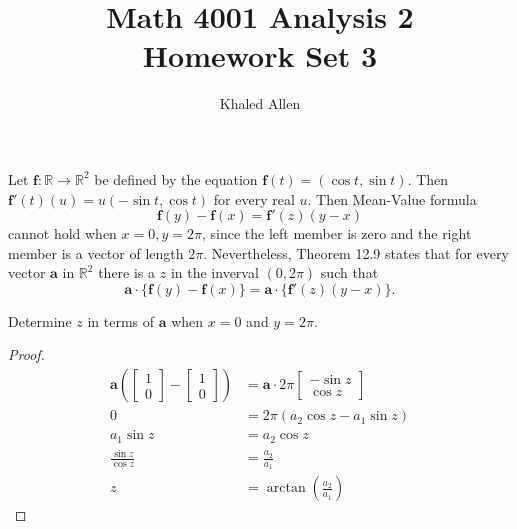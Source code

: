 \documentclass[12pt]{article}
\newcommand{\R}{\mathbb{R}}
\newcommand{\bvec}[1]{\textbf{#1}}
\newenvironment{problem}[2][Problem]{\begin{trivlist}
\item[\hskip \labelsep {\bfseries #1}\hskip \labelsep {\bfseries #2.}]}{\end{trivlist}}
\begin{document}
\title{%
  \large Math 4001 Analysis 2 \\
  Homework Set 3
  }
  \author{Khaled Allen}
\maketitle

\begin{problem}{Apos. 12.19}
Let $\textbf{f}:\R\to\R^2$ be defined by the equation $\textbf{f}(t)=(\cos t, \sin t)$. Then $\textbf{f}'(t)(u)=u(-\sin t, \cos t)$ for every real $u$. Then Mean-Value formula 
\[\textbf{f}(y)-\textbf{f}(x)=\textbf{f}'(z)(y-x)\]
cannot hold when $x=0, y=2\pi$, since the left member is zero and the right member is a vector of length $2\pi$. Nevertheless, Theorem 12.9 states that for every vector $\textbf{a}$ in $\R^2$ there is a $z$ in the inverval $(0,2\pi)$ such that 
\[\textbf{a}\cdot\{\textbf{f}(y)-\textbf{f}(x)\}=\textbf{a}\cdot\{\bvec{f}'(z)(y-x)\}.\]

Determine $z$ in terms of $\textbf{a}$ when $x=0$ and $y=2\pi$.
\end{problem}
\begin{proof}
\begin{align*}
\bvec{a}\left(\begin{bmatrix}1\\0\end{bmatrix}-\begin{bmatrix}1\\
0\end{bmatrix}\right)&=\bvec{a}\cdot2\pi\begin{bmatrix}-\sin z\\\cos z
\end{bmatrix}\\
    0&=2\pi\left(a_2\cos z -a_1\sin z\right)\\
a_1\sin z&=a_2 \cos z\\
\frac{\sin z}{\cos z}&=\frac{a_2}{a_1}\\
z&=\arctan\left(\frac{a_2}{a_1}\right)
\end{align*}
\end{proof}
\end{document}
